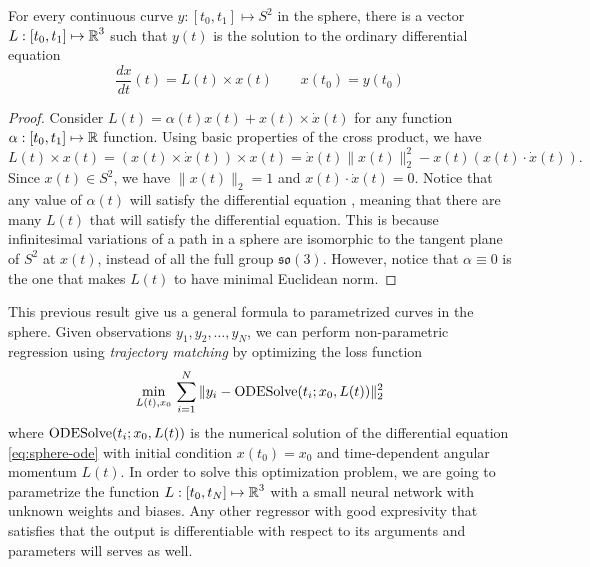 \begin{lemma}
For every continuous curve $y : [t_0, t_1] \mapsto S^2$ in the sphere, there is a vector $L : [t_0, t_1] \mapsto \operatorname{\mathbb{R}}^3$ such that $y(t)$ is the solution to the ordinary differential equation 
\begin{equation}
    \frac{dx}{dt}(t) = L(t) \times x(t) \qquad x(t_0) = y(t_0)
\end{equation}
\end{lemma}

\begin{proof}
Consider $L(t) = \alpha(t) x(t) + x(t) \times \dot x (t)$ for any function $\alpha : [t_0, t_1] \mapsto \operatorname{\mathbb{R}}$ function. 
Using basic properties of the cross product, we have 
\begin{equation}
    L(t) \times x(t)
    = 
    (x(t) \times \dot x (t)) \times x(t)
    = 
    \dot x(t) \| x(t) \|_2^2 - x(t) (x(t) \cdot \dot x(t)).
\end{equation}
Since $x(t) \in S^2$, we have $\| x(t) \|_2 = 1$ and $x(t) \cdot \dot x(t) = 0$.
Notice that any value of $\alpha(t)$ will satisfy the differential equation , meaning that there are many $L(t)$ that will satisfy the differential equation.
This is because infinitesimal variations of a path in a sphere are isomorphic to the tangent plane of $S^2$ at $x(t)$, instead of all the full group $\mathfrak{so}(3)$.
However, notice that $\alpha \equiv 0$ is the one that makes $L(t)$ to have minimal Euclidean norm. 
\end{proof}

This previous result give us a general formula to parametrized curves in the sphere. 
Given observations $y_1, y_2, \ldots, y_N$, we can perform non-parametric regression using \textit{trajectory matching} \cite{ramsay2017dynamic} by optimizing the loss function 
\begin{equation}
 \min_{L(t), x_0} \,
 \sum_{i=1}^N \| y_i - \operatorname{\text{ODESolve}} (t_i ; x_0, L(t)) \|_2^2
\end{equation}
where $\operatorname{\text{ODESolve}} (t_i ; x_0, L(t))$ is the numerical solution of the differential equation \eqref{eq:sphere-ode} with initial condition $x(t_0) = x_0$ and time-dependent angular momentum $L(t)$. 
In order to solve this optimization problem, we are going to parametrize the function $L: [t_0, t_N] \mapsto \operatorname{\mathbb{R}}^3$ with a small neural network with unknown weights and biases. 
Any other regressor with good expresivity that satisfies that the output is differentiable with respect to its arguments and parameters will serves as well. 

